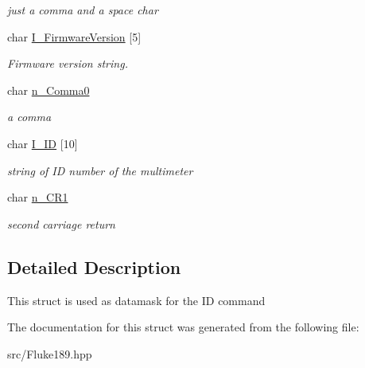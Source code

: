 \begin{DoxyCompactItemize}
\begin{DoxyCompactList}\small\item\em just a comma and a space char \item\end{DoxyCompactList}\item 
\hypertarget{structFluke_1_1Fluke189_1_1cmdr__ID__t_a42650884119166ca70415cde54854f68}{
char \hyperlink{structFluke_1_1Fluke189_1_1cmdr__ID__t_a42650884119166ca70415cde54854f68}{I\_\-FirmwareVersion} \mbox{[}5\mbox{]}}
\label{structFluke_1_1Fluke189_1_1cmdr__ID__t_a42650884119166ca70415cde54854f68}

\begin{DoxyCompactList}\small\item\em Firmware version string. \item\end{DoxyCompactList}\item 
\hypertarget{structFluke_1_1Fluke189_1_1cmdr__ID__t_a10aa8b9107b58b67e7c0c32e4f0fc6df}{
char \hyperlink{structFluke_1_1Fluke189_1_1cmdr__ID__t_a10aa8b9107b58b67e7c0c32e4f0fc6df}{n\_\-Comma0}}
\label{structFluke_1_1Fluke189_1_1cmdr__ID__t_a10aa8b9107b58b67e7c0c32e4f0fc6df}

\begin{DoxyCompactList}\small\item\em a comma \item\end{DoxyCompactList}\item 
\hypertarget{structFluke_1_1Fluke189_1_1cmdr__ID__t_ab4cac5db4089e42498abcdbb858065d2}{
char \hyperlink{structFluke_1_1Fluke189_1_1cmdr__ID__t_ab4cac5db4089e42498abcdbb858065d2}{I\_\-ID} \mbox{[}10\mbox{]}}
\label{structFluke_1_1Fluke189_1_1cmdr__ID__t_ab4cac5db4089e42498abcdbb858065d2}

\begin{DoxyCompactList}\small\item\em string of ID number of the multimeter \item\end{DoxyCompactList}\item 
\hypertarget{structFluke_1_1Fluke189_1_1cmdr__ID__t_a536695fd7989622726a720403841d119}{
char \hyperlink{structFluke_1_1Fluke189_1_1cmdr__ID__t_a536695fd7989622726a720403841d119}{n\_\-CR1}}
\label{structFluke_1_1Fluke189_1_1cmdr__ID__t_a536695fd7989622726a720403841d119}

\begin{DoxyCompactList}\small\item\em second carriage return \item\end{DoxyCompactList}\end{DoxyCompactItemize}


\subsection{Detailed Description}
This struct is used as datamask for the ID command 

The documentation for this struct was generated from the following file:\begin{DoxyCompactItemize}
\item 
src/Fluke189.hpp\end{DoxyCompactItemize}
